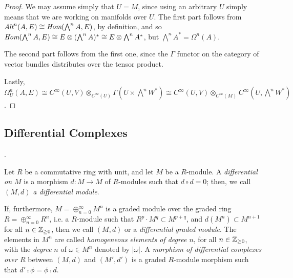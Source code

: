 \begin{proof}
We may assume simply that $U = M$, since using an arbitrary $U$ simply means that we are working on manifolds over $U$. The first part follows from $\operatorname{\textit{Alt}}^n(A, E) \cong \operatorname{\textit{Hom}}(\bigwedge^n A, E)$, by definition, and so $\operatorname{\textit{Hom}}(\bigwedge^n A, E) \cong E \otimes (\bigwedge^n A)^* \cong E \otimes \bigwedge^n A^*$, but $\bigwedge^n A^* = \Omega^n(A)$.

The second part follows from the first one, since the $\Gamma$ functor on the category of vector bundles distributes over the tensor product.

Lastly, $\Omega_U^n(A, E) \cong C^\infty(U, V) \otimes_{C^\infty(U)} \Gamma(U \times \bigwedge^n W^*) \cong C^\infty(U, V) \otimes_{C^\infty(M)} C^\infty\left(U, \bigwedge^n W^* \right)$.
\end{proof}

\subsection{Differential Complexes}

.



\begin{definition}
    Let $R$ be a commutative ring with unit, and let $M$ be a $R$-module. 
    A \emph{differential on $M$} is a morphism $d: M \to M$ of $R$-modules such that $d\circ d = 0$; then, we call $(M, d)$ \emph{a differential module}. 
    
\noindent    If, furthermore, $M = \oplus_{n = 0}^\infty M^n$ is a graded module over the graded ring $R = \oplus_{n = 0}^\infty R^n$, i.e. a $R$-module such that $R^p \cdot M^q \subset M^{p+q}$, and $d(M^n) \subset M^{n+1}$ for all $n \in \mathbb{Z}_{\geq 0}$, then we call $(M, d)$  or a \emph{differential graded module}. The elements in $M^n$ are called \emph{homogeneous elements of degree $n$}, for all $n \in \mathbb{Z}_{\geq 0}$, with the \emph{degree} $n$ of $\omega \in M^n$ denoted by $|\omega|$. A \emph{morphism of differential complexes over $R$} between $(M, d)$ and $(M', d')$ is a graded $R$-module morphism such that $d' \comp \phi = \phi \comp d$.
\end{definition}

